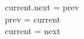 \documentclass[preview]{standalone}
\begin{document}
current.next = prev\\prev = current\\current = next\\
\end{document}
